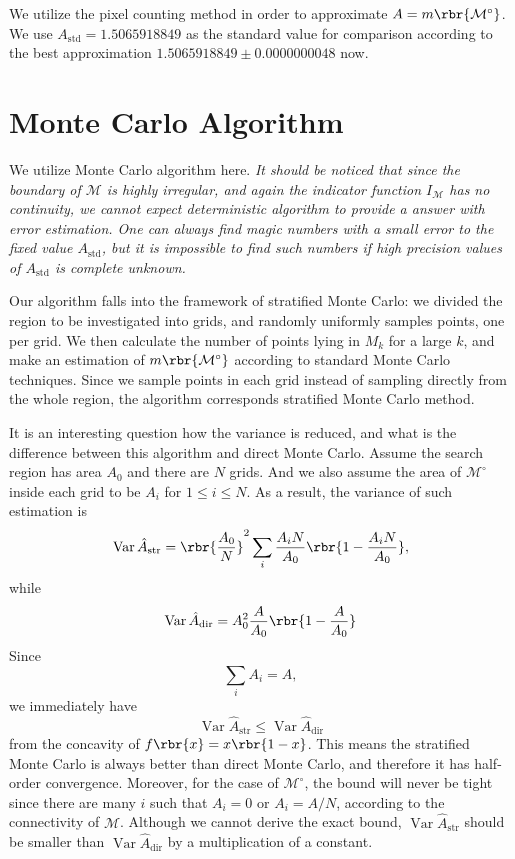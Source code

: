 \documentclass[english, nochinese]{pnote}
\DeclareMathOperator\opvar{\mathrm{Var}}
\begin{document}
We utilize the pixel counting method in order to approximate $ A = m \rbr{\mathcal{M}^{\circ}} $. We use $ A_{\text{std}} = 1.5065918849 $ as the standard value for comparison according to the best approximation $ 1.5065918849 \pm 0.0000000048 $ now.

\section{Monte Carlo Algorithm}

We utilize Monte Carlo algorithm here. \emph{It should be noticed that since the boundary of $\mathcal{M}$ is highly irregular, and again the indicator function $I_{\mathcal{M}}$ has no continuity, we cannot expect deterministic algorithm to provide a answer with error estimation. One can always find magic numbers with a small error to the fixed value $A_{\text{std}}$, but it is impossible to find such numbers if high precision values of $A_{\text{std}}$ is complete unknown.}

Our algorithm falls into the framework of stratified Monte Carlo: we divided the region to be investigated into grids, and randomly uniformly samples points, one per grid. We then calculate the number of points lying in $M_k$ for a large $k$, and make an estimation of $ m \rbr{\mathcal{M}^{\circ}} $ according to standard Monte Carlo techniques. Since we sample points in each grid instead of sampling directly from the whole region, the algorithm corresponds stratified Monte Carlo method.

It is an interesting question how the variance is reduced, and what is the difference between this algorithm and direct Monte Carlo. Assume the search region has area $A_0$ and there are $N$ grids. And we also assume the area of $\mathcal{M}^{\circ}$ inside each grid to be $A_i$ for $ 1 \le i \le N $. As a result, the variance of such estimation is
\begin{equation}
\opvar \hat{A}_{\text{str}} = \rbr{\frac{A_0}{N}}^2 \sum_i \frac{ A_i N }{A_0} \rbr{ 1 - \frac{ A_i N }{A_0 } },
\end{equation}
while
\begin{equation}
\opvar \hat{A}_{\text{dir}} = A_0^2 \frac{A}{A_0} \rbr{ 1 - \frac{A}{A_0} }
\end{equation}
Since
\begin{equation}
\sum_i A_i = A,
\end{equation}
we immediately have
\begin{equation} \label{Eq:Upper}
\opvar \hat{A}_{\text{str}} \le \opvar \hat{A}_{\text{dir}}
\end{equation}
from the concavity of $ f \rbr{x} = x \rbr{ 1 - x } $. This means the stratified Monte Carlo is always better than direct Monte Carlo, and therefore it has half-order convergence. Moreover, for the case of $\mathcal{M}^{\circ}$, the bound will never be tight since there are many $i$ such that $ A_i = 0 $ or $ A_i = A / N $, according to the connectivity of $\mathcal{M}$. Although we cannot derive the exact bound, $ \opvar \hat{A}_{\text{str}} $ should be smaller than $ \opvar \hat{A}_{\text{dir}} $ by a multiplication of a constant.
\end{document}
